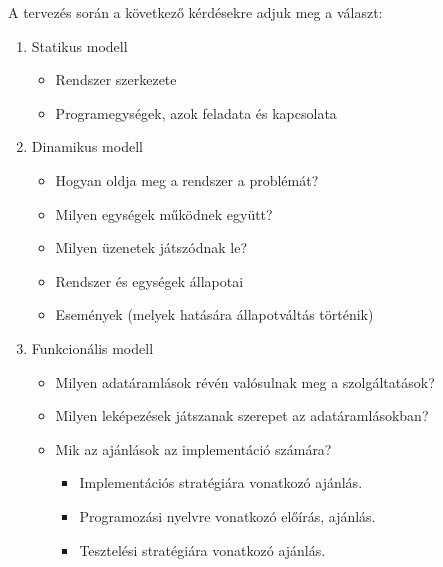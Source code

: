 \documentclass[margin=0px]{article}
\begin{document}
\begin{enumerate}
          A tervezés során a következő kérdésekre adjuk
          meg a választ:
          \begin{enumerate}
              \item Statikus modell
                    \begin{itemize}
                        \item Rendszer szerkezete
                        \item Programegységek, azok feladata és kapcsolata
                    \end{itemize}
              \item Dinamikus modell
                    \begin{itemize}
                        \item Hogyan oldja meg a rendszer a problémát?
                        \item Milyen egységek működnek együtt?
                        \item Milyen üzenetek játszódnak le?
                        \item Rendszer és egységek állapotai
                        \item Események (melyek hatására állapotváltás történik)
                    \end{itemize}

              \item Funkcionális modell
                    \begin{itemize}
                        \item Milyen adatáramlások révén valósulnak meg a szolgáltatások?
                        \item Milyen leképezések játszanak szerepet az adatáramlásokban?
                        \item Mik az ajánlások az implementáció számára?
                              \begin{itemize}
                                  \item Implementációs stratégiára vonatkozó ajánlás.
                                  \item Programozási nyelvre vonatkozó előírás, ajánlás.
                                  \item Tesztelési stratégiára vonatkozó ajánlás.
                              \end{itemize}
                    \end{itemize}
          \end{enumerate}


\end{enumerate}
\end{document}
